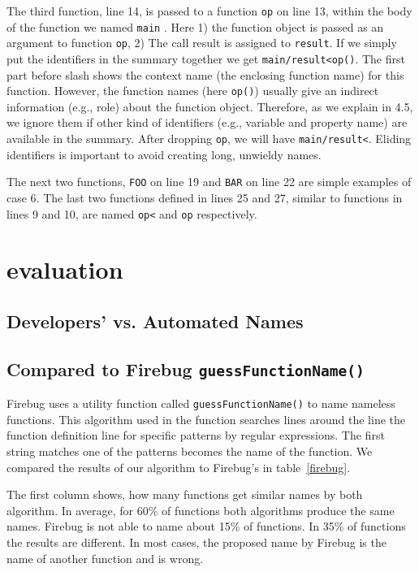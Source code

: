 \documentclass[10pt, preprint]{sigplanconf}
\begin{document}
The third function, line 14, is passed to a function {\small\texttt{op}} on line 13, within the body of the function we named {\small\texttt{main}} . Here 1) the function object is passed as an argument to function {\small\texttt{op}}, 2) The call result is assigned to {\small\texttt{result}}. If we simply put the identifiers in the summary together we get {\small\texttt{main/result<op()}}. The first part before slash  shows the context name (the enclosing function name) for this function.  However, the function names (here {\small\texttt{op()}}) usually give an indirect information (e.g., role) about the function object. Therefore, as we explain in 4.5, we ignore them if other kind of identifiers (e.g., variable and property name) are available in the summary. After dropping {\small\texttt{op}}, we will have {\small\texttt{main/result<}}. Eliding identifiers is important to avoid creating long, unwieldy names.

The next two functions, {\small\texttt{FOO}} on line 19 and {\small\texttt{BAR}} on line 22 are simple examples of case 6.  The last two functions defined in lines 25 and 27, similar to functions in lines 9 and 10, are named {\small\texttt{op<}} and {\small\texttt{op}} respectively. 


\section{evaluation}


\subsection{Developers' vs. Automated Names}

\subsection{Compared to Firebug {\large \texttt{guessFunctionName()}}}
Firebug uses a utility function called {\small \texttt{guessFunctionName()}} to name nameless functions.
This algorithm used in the function searches lines around the line the function definition line for specific patterns by regular expressions. The
  first string matches one of the patterns becomes the name of the function. We compared the results of our algorithm to Firebug's in table~\ref{firebug}.
  
The first column shows, how many functions get similar names by both algorithm. In average, for 60\% of functions both algorithms produce the same names.
Firebug is not able to name about 15\% of functions. In 35\% of functions the results are different. In most cases, the proposed name by Firebug is the name of another function and is wrong.
  
\end{document}
